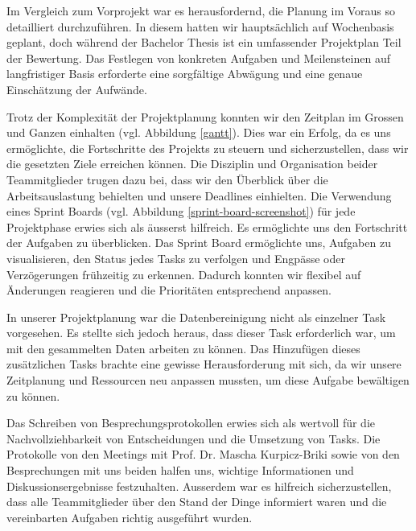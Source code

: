 Im Vergleich zum Vorprojekt war es herausfordernd, die Planung im Voraus so detailliert durchzuführen. 
In diesem hatten wir hauptsächlich auf Wochenbasis geplant, doch während der Bachelor Thesis ist ein umfassender Projektplan Teil der Bewertung. 
Das Festlegen von konkreten Aufgaben und Meilensteinen auf langfristiger Basis erforderte eine sorgfältige Abwägung und eine genaue 
Einschätzung der Aufwände.

Trotz der Komplexität der Projektplanung konnten wir den Zeitplan im Grossen und Ganzen einhalten (vgl. Abbildung \ref{gantt}). 
Dies war ein Erfolg, da es uns ermöglichte, die Fortschritte des Projekts zu steuern und sicherzustellen, dass wir die gesetzten Ziele 
erreichen können. 
Die Disziplin und Organisation beider Teammitglieder trugen dazu bei, dass wir den Überblick über die Arbeitsauslastung behielten und  
unsere Deadlines einhielten.
Die Verwendung eines Sprint Boards (vgl. Abbildung \ref{sprint-board-screenshot}) für jede Projektphase erwies sich als äusserst hilfreich. Es ermöglichte uns den Fortschritt der Aufgaben zu überblicken. 
Das Sprint Board ermöglichte uns, Aufgaben zu visualisieren, den Status jedes Tasks zu verfolgen und Engpässe oder Verzögerungen frühzeitig zu erkennen. 
Dadurch konnten wir flexibel auf Änderungen reagieren und die Prioritäten entsprechend anpassen.

In unserer Projektplanung war die Datenbereinigung nicht als einzelner Task vorgesehen. 
Es stellte sich jedoch heraus, dass dieser Task erforderlich war, um mit den gesammelten Daten arbeiten zu können. 
Das Hinzufügen dieses zusätzlichen Tasks brachte eine gewisse Herausforderung mit sich, da wir unsere Zeitplanung und 
Ressourcen neu anpassen mussten, um diese Aufgabe bewältigen zu können.

Das Schreiben von Besprechungsprotokollen erwies sich als wertvoll für die Nachvollziehbarkeit von Entscheidungen und die Umsetzung von Tasks. 
Die Protokolle von den Meetings mit Prof. Dr. Mascha Kurpicz-Briki sowie von den Besprechungen mit uns beiden halfen uns, wichtige Informationen und Diskussionsergebnisse festzuhalten. 
Ausserdem war es hilfreich sicherzustellen, dass alle Teammitglieder über den Stand der Dinge informiert waren und die vereinbarten Aufgaben richtig ausgeführt wurden.

